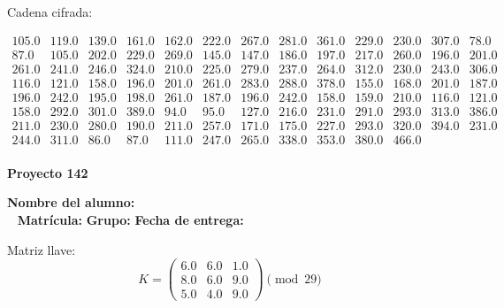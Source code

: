 \documentclass[12pt]{article}
\begin{document}
Cadena cifrada:
\begin{center}
$\begin{array}{lllllllllllll}
105.0 & 119.0 & 139.0 & 161.0 & 162.0 & 222.0 & 267.0 & 281.0 & 361.0 & 229.0 & 230.0 & 307.0 & 78.0\\
87.0 & 105.0 & 202.0 & 229.0 & 269.0 & 145.0 & 147.0 & 186.0 & 197.0 & 217.0 & 260.0 & 196.0 & 201.0\\
261.0 & 241.0 & 246.0 & 324.0 & 210.0 & 225.0 & 279.0 & 237.0 & 264.0 & 312.0 & 230.0 & 243.0 & 306.0\\
116.0 & 121.0 & 158.0 & 196.0 & 201.0 & 261.0 & 283.0 & 288.0 & 378.0 & 155.0 & 168.0 & 201.0 & 187.0\\
196.0 & 242.0 & 195.0 & 198.0 & 261.0 & 187.0 & 196.0 & 242.0 & 158.0 & 159.0 & 210.0 & 116.0 & 121.0\\
158.0 & 292.0 & 301.0 & 389.0 & 94.0 & 95.0 & 127.0 & 216.0 & 231.0 & 291.0 & 293.0 & 313.0 & 386.0\\
211.0 & 230.0 & 280.0 & 190.0 & 211.0 & 257.0 & 171.0 & 175.0 & 227.0 & 293.0 & 320.0 & 394.0 & 231.0\\
244.0 & 311.0 & 86.0 & 87.0 & 111.0 & 247.0 & 265.0 & 338.0 & 353.0 & 380.0 & 466.0\\
\end{array}$
\end{center}

\newpage


\textbf{Proyecto 142}

\textbf{Nombre del alumno:} \underline{\hspace{13cm}}\\\
\vspace{1cm}
\textbf{Matrícula:} \underline{\hspace{4cm}} \hspace{1cm}
\textbf{Grupo:} \underline{\hspace{2cm}}
\textbf{Fecha de entrega:} \underline{\hspace{2cm}}

\medskip

Matriz llave:
\[
K = \begin{pmatrix}
6.0 & 6.0 & 1.0\\
8.0 & 6.0 & 9.0\\
5.0 & 4.0 & 9.0
\end{pmatrix} \pmod{29}
\]
\end{document}

